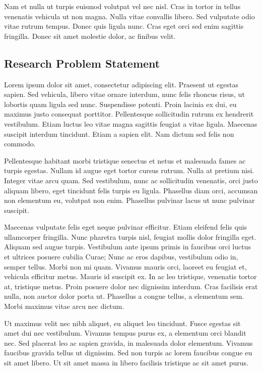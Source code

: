 \documentclass[runningheads,a4paper]{llncs}
\begin{document}
Nam et nulla ut turpis euismod volutpat vel nec nisl. Cras in tortor in tellus venenatis vehicula ut non magna. Nulla vitae convallis libero. Sed vulputate odio vitae rutrum tempus. Donec quis ligula nunc. Cras eget orci sed enim sagittis fringilla. Donec sit amet molestie dolor, ac finibus velit.  \citep*{goossens93}
%
\newpage
%
\subsection{Research Problem Statement}
Lorem ipsum dolor sit amet, consectetur adipiscing elit. Praesent ut egestas sapien. Sed vehicula, libero vitae ornare interdum, nunc felis rhoncus risus, ut lobortis quam ligula sed nunc. Suspendisse potenti. Proin lacinia ex dui, eu maximus justo consequat porttitor. Pellentesque sollicitudin rutrum ex hendrerit vestibulum. Etiam luctus leo vitae magna sagittis feugiat a vitae ligula. Maecenas suscipit interdum tincidunt. Etiam a sapien elit. Nam dictum sed felis non commodo.

Pellentesque habitant morbi tristique senectus et netus et malesuada fames ac turpis egestas. Nullam id augue eget tortor cursus rutrum. Nulla at pretium nisi. Integer vitae arcu quam. Sed vestibulum, nunc ac sollicitudin venenatis, orci justo aliquam libero, eget tincidunt felis turpis eu ligula. Phasellus diam orci, accumsan non elementum eu, volutpat non enim. Phasellus pulvinar lacus ut nunc pulvinar suscipit.

Maecenas vulputate felis eget neque pulvinar efficitur. Etiam eleifend felis quis ullamcorper fringilla. Nunc pharetra turpis nisl, feugiat mollis dolor fringilla eget. Aliquam sed augue turpis. Vestibulum ante ipsum primis in faucibus orci luctus et ultrices posuere cubilia Curae; Nunc ac eros dapibus, vestibulum odio in, semper tellus. Morbi non mi quam. Vivamus mauris orci, laoreet eu feugiat et, vehicula efficitur metus. Mauris id suscipit ex. In ac leo tristique, venenatis tortor at, tristique metus. Proin posuere dolor nec dignissim interdum. Cras facilisis erat nulla, non auctor dolor porta ut. Phasellus a congue tellus, a elementum sem. Morbi maximus vitae arcu nec dictum.

Ut maximus velit nec nibh aliquet, eu aliquet leo tincidunt. Fusce egestas sit amet dui nec vestibulum. Vivamus tempus purus ex, a elementum orci blandit nec. Sed placerat leo ac sapien gravida, in malesuada dolor elementum. Vivamus faucibus gravida tellus ut dignissim. Sed non turpis ac lorem faucibus congue eu sit amet libero. Ut sit amet massa in libero facilisis tristique ac sit amet purus.
\end{document}
